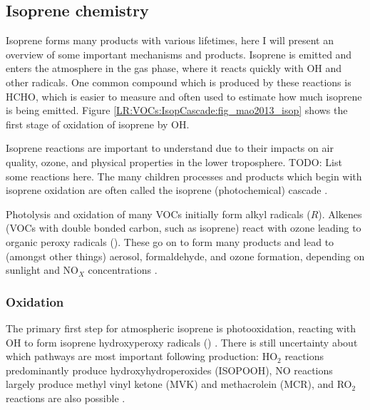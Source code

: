   \subsection{Isoprene chemistry}
    \label{LR:VOCs:IsopCascade}
    
    Isoprene forms many products with various lifetimes, here I will present an overview of some important mechanisms and products.
    Isoprene is emitted and enters the atmosphere in the gas phase, where it reacts quickly with OH and other radicals.
    One common compound which is produced by these reactions is HCHO, which is easier to measure and often used to estimate how much isoprene is being emitted.
    Figure \ref{LR:VOCs:IsopCascade:fig_mao2013_isop} shows the first stage of oxidation of isoprene by OH.
    
    
    Isoprene reactions are important to understand due to their impacts on air quality, ozone, and physical properties in the lower troposphere.
    TODO: List some reactions here.
    The many children processes and products which begin with isoprene oxidation are often called the isoprene (photochemical) cascade \parencite{Crounse2012,Paulot2012,Wolfe2016}.
    
    Photolysis and oxidation of many VOCs initially form alkyl radicals ($R\dot{}$).
    Alkenes (VOCs with double bonded carbon, such as isoprene) react with ozone leading to organic peroxy radicals (\roo). 
    These go on to form many products and lead to (amongst other things) aerosol, formaldehyde, and ozone formation, depending on sunlight and NO$_X$ concentrations \parencite{Atkinson2000}.
    
    \subsubsection{Oxidation}
      The primary first step for atmospheric isoprene is photooxidation, reacting with OH to form isoprene hydroxyperoxy radicals (\roo) \parencite{Wolfe2016,Marvin2017,Patchen2017}.
      There is still uncertainty about which pathways are most important following \roo production: HO$_2$ reactions predominantly produce hydroxyhydroperoxides (ISOPOOH), NO reactions largely produce methyl vinyl ketone (MVK) and methacrolein (MCR), and RO$_2$ reactions are also possible \textcite{Liu2016a}.
      
